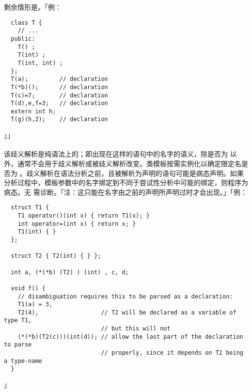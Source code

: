 剩余情形是。「例：
\begin{lstlisting}
  class T {
    // ...
  public:
    T() ;
    T(int) ;
    T(int, int) ;
  };
  T(a);         // declaration
  T(*b)();      // declaration
  T(c)=7;       // declaration
  T(d),e,f=3;   // declaration
  extern int h;
  T(g)(h,2);    // declaration
\end{lstlisting}」」

\paragraph{}
该歧义解析是纯语法上的；即出现在这样的语句中的名字的语义，除是否为
以外，通常不会用于歧义解析或被歧义解析改变。类模板按需实例化以确定限定名是否为
。歧义解析在语法分析之前，且被解析为声明的语句可能是病态声明。如果
分析过程中，模板参数中的名字绑定到不同于尝试性分析中可能的绑定，则程序为病态。无
需诊断。「注：这只能在名字由之前的声明所声明过时才会出现。」「例：
\begin{lstlisting}
  struct T1 {
    T1 operator()(int x) { return T1(x); }
    int operator=(int x) { return x; }
    T1(int) { }
  };

  struct T2 { T2(int) { } };

  int a, (*(*b) (T2) ) (int) , c, d;

  void f() {
    // disambiguation requires this to be parsed as a declaration:
    T1(a) = 3,
    T2(4),                  // T2 will be declared as a variable of type T1,
                            // but this will not
    (*(*b)(T2(c)))(int(d)); // allow the last part of the declaration to parse
                            // properly, since it depends on T2 being a type-name
  }
\end{lstlisting}」
